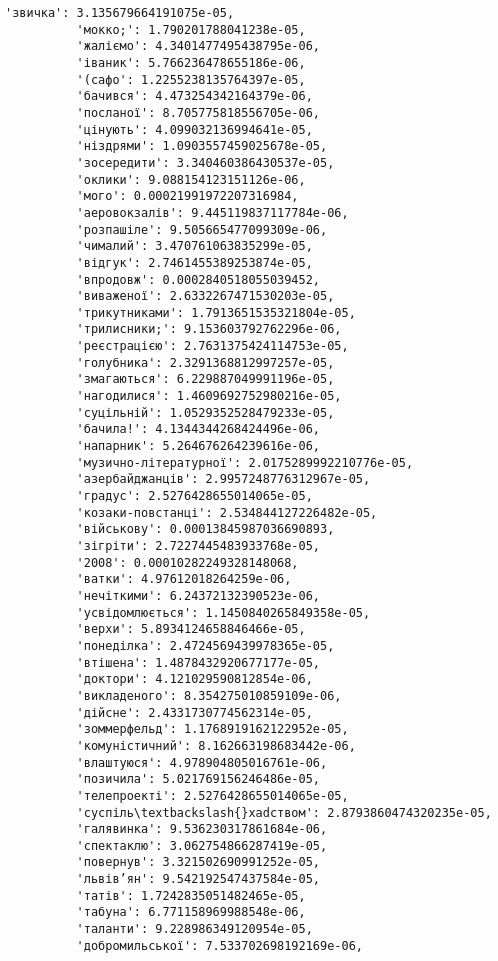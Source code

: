 \documentclass[11pt]{article}
\begin{document}
\begin{Verbatim}[commandchars=\\\{\}]
          'звичка': 3.135679664191075e-05,
          'мокко;': 1.790201788041238e-05,
          'жаліємо': 4.3401477495438795e-06,
          'іваник': 5.766236478655186e-06,
          '(сафо': 1.2255238135764397e-05,
          'бачився': 4.473254342164379e-06,
          'посланої': 8.705775818556705e-06,
          'цінують': 4.099032136994641e-05,
          'ніздрями': 1.0903557459025678e-05,
          'зосередити': 3.340460386430537e-05,
          'оклики': 9.088154123151126e-06,
          'мого': 0.00021991972207316984,
          'аеровокзалів': 9.445119837117784e-06,
          'розпашіле': 9.505665477099309e-06,
          'чималий': 3.470761063835299e-05,
          'відгук': 2.7461455389253874e-05,
          'впродовж': 0.0002840518055039452,
          'виваженої': 2.6332267471530203e-05,
          'трикутниками': 1.7913651535321804e-05,
          'трилисники;': 9.153603792762296e-06,
          'реєстрацією': 2.7631375424114753e-05,
          'голубника': 2.3291368812997257e-05,
          'змагаються': 6.229887049991196e-05,
          'нагодилися': 1.4609692752980216e-05,
          'суцільній': 1.0529352528479233e-05,
          'бачила!': 4.1344344268424496e-06,
          'напарник': 5.264676264239616e-06,
          'музично-літературної': 2.0175289992210776e-05,
          'азербайджанців': 2.9957248776312967e-05,
          'градус': 2.5276428655014065e-05,
          'козаки-повстанці': 2.534844127226482e-05,
          'військову': 0.00013845987036690893,
          'зігріти': 2.7227445483933768e-05,
          '2008': 0.00010282249328148068,
          'ватки': 4.97612018264259e-06,
          'нечіткими': 6.24372132390523e-06,
          'усвідомлюється': 1.1450840265849358e-05,
          'верхи': 5.8934124658846466e-05,
          'понеділка': 2.4724569439978365e-05,
          'втішена': 1.4878432920677177e-05,
          'доктори': 4.121029590812854e-06,
          'викладеного': 8.354275010859109e-06,
          'дійсне': 2.4331730774562314e-05,
          'зоммерфельд': 1.1768919162122952e-05,
          'комуністичний': 8.162663198683442e-06,
          'влаштуюся': 4.978904805016761e-06,
          'позичила': 5.021769156246486e-05,
          'телепроекті': 2.5276428655014065e-05,
          'суспіль\textbackslash{}xadством': 2.8793860474320235e-05,
          'галявинка': 9.536230317861684e-06,
          'спектаклю': 3.062754866287419e-05,
          'повернув': 3.321502690991252e-05,
          'львів’ян': 9.542192547437584e-05,
          'татів': 1.7242835051482465e-05,
          'табуна': 6.771158969988548e-06,
          'таланти': 9.228986349120954e-05,
          'добромильської': 7.533702698192169e-06,

\end{Verbatim}
\end{document}
